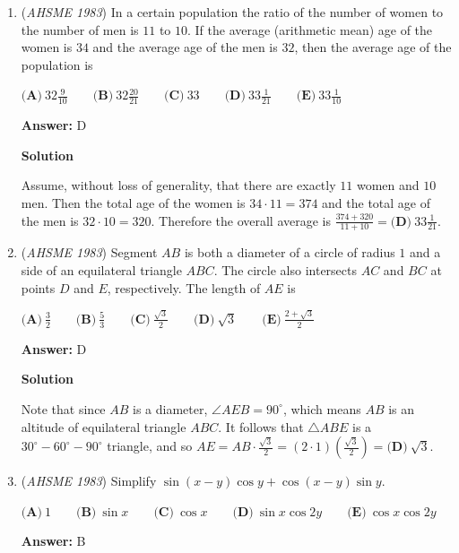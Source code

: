 \begin{enumerate}
 


	\item (\textit{AHSME 1983}) In a certain population the ratio of the number of women to the number of men is $11$ to $10$. 
If the average (arithmetic mean) age of the women is $34$ and the average age of the men is $32$, 
then the average age of the population is


 $\textbf{(A)}\ 32\frac{9}{10}\qquad \textbf{(B)}\ 32\frac{20}{21}\qquad \textbf{(C)}\ 33\qquad \textbf{(D)}\ 33\frac{1}{21}\qquad \textbf{(E)}\ 33\frac{1}{10}$

 \textbf{Answer: }D



\textbf{Solution}

Assume, without loss of generality, that there are exactly $11$ women and $10$ men. Then the total age of the women is $34 \cdot 11 = 374$ and the total age of the men is $32 \cdot 10 = 320$. Therefore the overall average is $\frac{374+320}{11+10} = \boxed{\textbf{(D)}\ 33\frac{1}{21}}$.

 


	\item (\textit{AHSME 1983}) Segment $AB$ is both a diameter of a circle of radius $1$ and a side of an equilateral triangle $ABC$. 
The circle also intersects $AC$ and $BC$ at points $D$ and $E$, respectively. The length of $AE$ is 


 $\textbf{(A)} \ \frac{3}{2} \qquad  \textbf{(B)} \ \frac{5}{3} \qquad  \textbf{(C)} \ \frac{\sqrt 3}{2} \qquad  \textbf{(D)}\ \sqrt{3}\qquad \textbf{(E)}\ \frac{2+\sqrt 3}{2}$

 \textbf{Answer: }D



\textbf{Solution}

Note that since $AB$ is a diameter, $\angle AEB = 90^{\circ}$, which means $AB$ is an altitude of equilateral triangle $ABC$. It follows that $\triangle ABE$ is a $30^{\circ}-60^{\circ}-90^{\circ}$ triangle, and so $AE = AB \cdot \frac{\sqrt{3}}{2} = (2 \cdot 1) (\frac{\sqrt{3}}{2}) = \boxed{\textbf{(D)}\ \sqrt{3}}$.

 


	\item (\textit{AHSME 1983}) Simplify $\sin (x-y) \cos y + \cos (x-y) \sin y$.


 $\textbf{(A)}\ 1\qquad \textbf{(B)}\ \sin x\qquad \textbf{(C)}\ \cos x\qquad \textbf{(D)}\ \sin x \cos 2y\qquad \textbf{(E)}\ \cos x\cos 2y$

 \textbf{Answer: }B




\end{enumerate}
